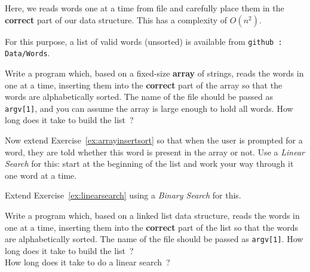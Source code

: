 
Here, we reads words one at a time
from file and carefully place them in the {\bf correct} part of
our data structure. This has a complexity of $O(n^2)$.

For this purpose, a list of valid words (unsorted) is available
from \verb^github : Data/Words^.

\begin{exercise}
\label{ex:arrayinsertsort}
Write a program which, based on a
fixed-size {\bf array} of strings, reads the words in
one at a time, inserting them into the {\bf correct} part of the array
so that the words are alphabetically sorted.
The name of the file should be passed as \verb^argv[1]^,
and you can assume the array is large enough to hold all words.
How long does it take to build the list~?
\end{exercise}

\begin{exercise}
\label{ex:linearsearch}
Now extend Exercise~\ref{ex:arrayinsertsort}
so that when the user is prompted for a word,
they are told whether this word is present in the array or not.
Use a {\em Linear Search} for this: start at the beginning of the
list and work your way through it one word at a time.
\end{exercise}

\begin{exercise}
\label{ex:binarysearch}
Extend Exercise~\ref{ex:linearsearch} using a
{\em Binary Search} for this.
\end{exercise}

\begin{exercise}
\label{ex:linkedinsertsort}
Write a program which, based on a
linked list data structure, reads the words in
one at a time, inserting them into the {\bf correct} part of the list
so that the words are alphabetically sorted.
The name of the file should be passed as \verb^argv[1]^.
How long does it take to build the list~?\\
How long does it take to do a linear search~?
\end{exercise}
